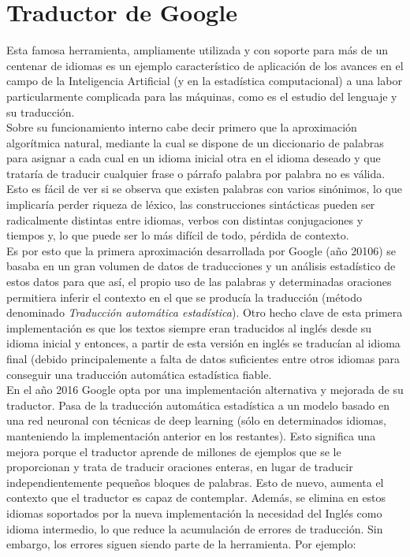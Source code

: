 \documentclass[final]{CSP}
\begin{document}
\section{Traductor de Google}

Esta famosa herramienta, ampliamente utilizada y con soporte para más de un centenar de idiomas 
es un ejemplo característico de aplicación de los avances en el campo de la Inteligencia 
Artificial (y en la estadística computacional) a una labor particularmente complicada para las
máquinas, como es el estudio del lenguaje y su traducción.\\

Sobre su funcionamiento interno cabe decir primero que la aproximación algorítmica natural, 
mediante la cual se dispone de un diccionario de palabras para asignar a cada cual en un idioma
inicial otra en el idioma deseado y que trataría de traducir cualquier frase o párrafo palabra
por palabra no es válida. Esto es fácil de ver si se observa que existen palabras con varios 
sinónimos, lo que implicaría perder riqueza de léxico, las construcciones sintácticas pueden ser
radicalmente distintas entre idiomas, verbos con distintas conjugaciones y tiempos y, lo que puede
ser lo más difícil de todo, pérdida de contexto.\\

Es por esto que la primera aproximación desarrollada por Google (año 20106) se basaba en un gran
volumen de datos de traducciones y un análisis estadístico de estos datos para que así, el propio
uso de las palabras y determinadas oraciones permitiera inferir el contexto en el que se producía
la traducción (método denominado \textit{Traducción automática estadística}). Otro hecho clave de
esta primera implementación es que los textos siempre eran traducidos al inglés desde su idioma
inicial y entonces, a partir de esta versión en inglés se traducían al idioma final (debido
principalemente a falta de datos suficientes entre otros idiomas para conseguir una traducción 
automática estadística fiable.\\

En el año 2016 Google opta por una implementación alternativa y mejorada de su traductor. Pasa
de la traducción automática estadística a un modelo basado en una red neuronal con técnicas de
deep learning (sólo en determinados idiomas, manteniendo la implementación anterior en los 
restantes). Esto significa una mejora porque el traductor aprende de millones de ejemplos que se
le proporcionan y trata de traducir oraciones enteras, en lugar de traducir independientemente
pequeños bloques de palabras. Esto de nuevo, aumenta el contexto que el traductor es capaz de 
contemplar. Además, se elimina en estos idiomas soportados por la nueva implementación la necesidad
del Inglés como idioma intermedio, lo que reduce la acumulación de errores de traducción. Sin 
embargo, los errores siguen siendo parte de la herramienta. Por ejemplo:
\end{document}
